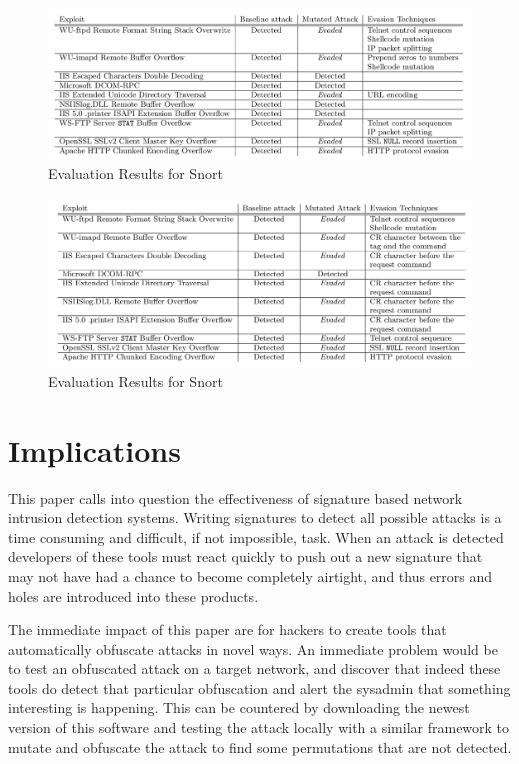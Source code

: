 \documentclass{reading_glasses}
\begin{document}
\begin{figure}
	\centering
	\includegraphics[width=1.0\textwidth]{SnortResults.png}
	\caption{Evaluation Results for Snort}
	\label{fig:snortRes}
\end{figure}

\begin{figure}
	\centering
	\includegraphics[width=1.0\textwidth]{IISRealSecureResults.png}
	\caption{Evaluation Results for Snort}
	\label{fig:realSecRes}
\end{figure}

\section{Implications}
This paper calls into question the effectiveness of signature based network intrusion detection systems.  Writing signatures to detect all possible attacks is a time consuming and difficult, if not impossible, task.  When an attack is detected developers of these tools must react quickly to push out a new signature that may not have had a chance to become completely airtight, and thus errors and holes are introduced into these products.  

The immediate impact of this paper are for hackers to create tools that automatically obfuscate attacks in novel ways.  An immediate problem would be to test an obfuscated attack on a target network, and discover that indeed these tools do detect that particular obfuscation and alert the sysadmin that something interesting is happening.  This can be countered by downloading the newest version of this software and testing the attack locally with a similar framework to mutate and obfuscate the attack to find some permutations that are not detected.  
\end{document}
